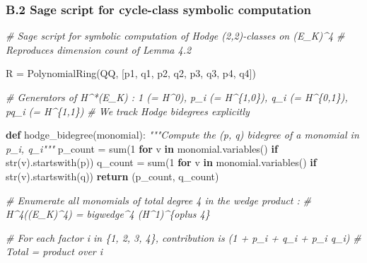 \documentclass[
  11pt,
  a4paper,
]{amsart}
\newenvironment{Shaded}{}{}
\newcommand{\BuiltInTok}[1]{\textcolor[rgb]{0.00,0.50,0.00}{#1}}
\newcommand{\CommentTok}[1]{\textcolor[rgb]{0.38,0.63,0.69}{\textit{#1}}}
\newcommand{\ControlFlowTok}[1]{\textcolor[rgb]{0.00,0.44,0.13}{\textbf{#1}}}
\newcommand{\DecValTok}[1]{\textcolor[rgb]{0.25,0.63,0.44}{#1}}
\newcommand{\KeywordTok}[1]{\textcolor[rgb]{0.00,0.44,0.13}{\textbf{#1}}}
\newcommand{\NormalTok}[1]{#1}
\newcommand{\OperatorTok}[1]{\textcolor[rgb]{0.40,0.40,0.40}{#1}}
\newcommand{\StringTok}[1]{\textcolor[rgb]{0.25,0.44,0.63}{#1}}
\begin{document}
\hypertarget{b.2-sage-script-for-cycle-class-symbolic-computation}{%
\subsubsection{B.2 Sage script for cycle-class symbolic computation}\label{b.2-sage-script-for-cycle-class-symbolic-computation}}

\begin{Shaded}
\begin{Highlighting}[]
\CommentTok{\# Sage script for symbolic computation of Hodge (2,2){-}classes on (E\_K)\^{}4}
\CommentTok{\# Reproduces dimension count of Lemma 4.2}

\NormalTok{R }\OperatorTok{=}\NormalTok{ PolynomialRing(QQ, [}\StringTok{\textquotesingle{}p1\textquotesingle{}}\NormalTok{, }\StringTok{\textquotesingle{}q1\textquotesingle{}}\NormalTok{, }\StringTok{\textquotesingle{}p2\textquotesingle{}}\NormalTok{, }\StringTok{\textquotesingle{}q2\textquotesingle{}}\NormalTok{, }\StringTok{\textquotesingle{}p3\textquotesingle{}}\NormalTok{, }\StringTok{\textquotesingle{}q3\textquotesingle{}}\NormalTok{, }\StringTok{\textquotesingle{}p4\textquotesingle{}}\NormalTok{, }\StringTok{\textquotesingle{}q4\textquotesingle{}}\NormalTok{])}

\CommentTok{\# Generators of H\^{}*(E\_K) : 1 (= H\^{}0), p\_i (= H\^{}\{1,0\}), q\_i (= H\^{}\{0,1\}), pq\_i (= H\^{}\{1,1\})}
\CommentTok{\# We track Hodge bidegrees explicitly}

\KeywordTok{def}\NormalTok{ hodge\_bidegree(monomial):}
    \CommentTok{"""Compute the (p, q) bidegree of a monomial in p\_i, q\_i"""}
\NormalTok{    p\_count }\OperatorTok{=} \BuiltInTok{sum}\NormalTok{(}\DecValTok{1} \ControlFlowTok{for}\NormalTok{ v }\KeywordTok{in}\NormalTok{ monomial.variables() }\ControlFlowTok{if} \BuiltInTok{str}\NormalTok{(v).startswith(}\StringTok{\textquotesingle{}p\textquotesingle{}}\NormalTok{))}
\NormalTok{    q\_count }\OperatorTok{=} \BuiltInTok{sum}\NormalTok{(}\DecValTok{1} \ControlFlowTok{for}\NormalTok{ v }\KeywordTok{in}\NormalTok{ monomial.variables() }\ControlFlowTok{if} \BuiltInTok{str}\NormalTok{(v).startswith(}\StringTok{\textquotesingle{}q\textquotesingle{}}\NormalTok{))}
    \ControlFlowTok{return}\NormalTok{ (p\_count, q\_count)}

\CommentTok{\# Enumerate all monomials of total degree 4 in the wedge product :}
\CommentTok{\# H\^{}4((E\_K)\^{}4) = bigwedge\^{}4 (H\^{}1)\^{}\{oplus 4\}}

\CommentTok{\# For each factor i in \{1, 2, 3, 4\}, contribution is (1 + p\_i + q\_i + p\_i q\_i)}
\CommentTok{\# Total = product over i}


\end{Highlighting}
\end{Shaded}
\end{document}
